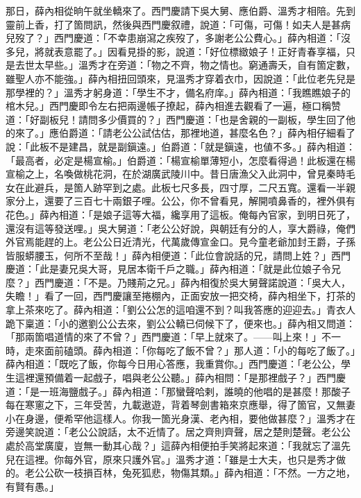 那日，薛內相從晌午就坐轎來了。西門慶請下吳大舅、應伯爵、溫秀才相陪。先到靈前上香，打了箇問訊，然後與西門慶叙禮，說道：「可傷，可傷！如夫人是甚病兒歿了？」{}西門慶道：「不幸患崩瀉之疾歿了，多謝老公公費心。」薛內相道：「沒多兒，將就表意罷了。」因看見掛的影，說道：「好位標緻娘子！{}正好青春享福，只是去世太早些。」溫秀才在旁道：「物之不齊，物之情也。{}窮通壽夭，自有箇定數，雖聖人亦不能強。」薛內相扭回頭來，見溫秀才穿着衣巾，{}因說道：「此位老先兒是那學裡的？」溫秀才躬身道：「學生不才，備名府庠。」薛內相道：「我瞧瞧娘子的棺木兒。」{}西門慶即令左右把兩邊帳子撩起，薛內相進去觀看了一遍，極口稱赞道：「好副板兒！請問多少價買的？」西門慶道：「也是舍親的一副板，學生回了他的來了。」應伯爵道：「請老公公試估估，那裡地道，甚麼名色？」薛內相仔細看了說：「此板不是建昌，就是副鎭遠。」伯爵道：「就是鎭遠，也値不多。」薛內相道：「最高者，必定是楊宣榆。」伯爵道：「楊宣榆單薄短小，怎麼看得過！此板還在楊宣榆之上，名喚做桃花洞，在於湖廣武陵川中。昔日唐漁父入此洞中，曾見秦時毛女在此避兵，是箇人跡罕到之處。此板七尺多長，四寸厚，二尺五寬。還看一半親家分上，還要了三百七十兩銀子哩。公公，你不曾看見，解開噴鼻香的，裡外俱有花色。」薛內相道：「是娘子這等大福，纔享用了這板。俺每內官家，到明日死了，還沒有這等發送哩。」吳大舅道：「老公公好說，與朝廷有分的人，享大爵祿，俺們外官焉能趕的上。老公公日近清光，代萬歲傳宣金口。見今童老爺加封王爵，子孫皆服蟒腰玉，何所不至哉！」薛內相便道：「此位會說話的兄，{}請問上姓？」西門慶道：「此是妻兄吳大哥，見居本衛千戶之職。」薛內相道：「就是此位娘子令兄麼？」{}西門慶道：「不是。乃賤荊之兄。」薛內相復於吳大舅聲諾說道：「吳大人，失瞻！」{}看了一回，西門慶讓至捲棚內，正面安放一把交椅，薛內相坐下，打茶的拿上茶來吃了。薛內相道：「劉公公怎的這咱還不到？叫我答應的迎迎去。」青衣人跪下稟道：「小的邀劉公公去來，劉公公轎已伺候下了，便來也。」薛內相又問道：「那兩箇唱道情的來了不曾？」西門慶道：「早上就來了。——叫上來！」不一時，走來面前磕頭。薛內相道：「你每吃了飯不曾？」那人道：「小的每吃了飯了。」薛內相道：「既吃了飯，你每今日用心答應，我重賞你。」西門慶道：「老公公，學生這裡還預備着一起戲子，唱與老公公聽。」薛內相問：「是那裡戲子？」西門慶道：「是一班海鹽戲子。」薛內相道：「那蠻聲哈剌，誰曉的他唱的是甚麼！那酸子每在寒窻之下，三年受苦，九載遨遊，背着琴劍書箱來京應舉，得了箇官，又無妻小在身邊，便希罕他這樣人。你我一箇光身漢、老內相，要他做甚麼？」溫秀才在旁邊笑說道：{}「老公公說話，太不近情了。居之齊則齊聲，居之楚則楚聲。老公公處於高堂廣廈，豈無一動其心哉？」這薛內相便拍手笑將起來道：「我就忘了溫先兒在這裡。你每外官，原來只護外官。」溫秀才道：「雖是士大夫，也只是秀才做的。老公公砍一枝損百林，兔死狐悲，物傷其類。」薛內相道：「不然。一方之地，有賢有愚。」


